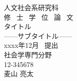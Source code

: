 \begin{titlepage}
\begin{spacing}{2.3}

\begin{center}
\vspace*{80truept}
{\huge 人文社会系研究科}\\
\vspace{30truept}
{\huge 修 \ 士 \ 学 \ 位 \ 論 \ 文}\\
\vspace{30truept}
{\huge タイトル}\\ %
{\LARGE ------サブタイトル------}\\ %
\vspace{100truept}
{\LARGE xxxx年12月 \ 提出}\\ %
{\LARGE 社会学専門分野}\\ %
{\LARGE 12-345678}\\ %
{\LARGE 麦山 亮太}\\ %
\end{center}

\end{spacing}
\end{titlepage}